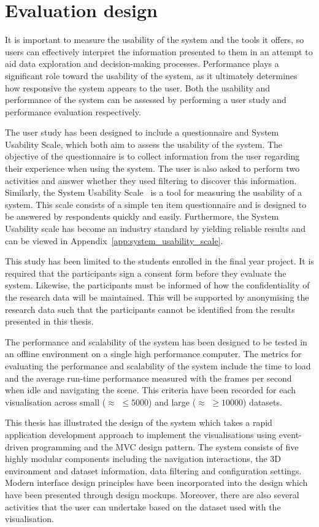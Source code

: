 \section{Evaluation design} {
\label{sec:evaluation_design}

	It is important to measure the usability of the system and the tools it offers, so users can effectively interpret the information presented to them in an attempt to aid data exploration and decision-making processes. Performance plays a significant role toward the usability of the system, as it ultimately determines how responsive the system appears to the user. Both the usability and performance of the system can be assessed by performing a user study and performance evaluation respectively.

	The user study has been designed to include a questionnaire and System Usability Scale, which both aim to assess the usability of the system. The objective of the questionnaire is to collect information from the user regarding their experience when using the system. The user is also asked to perform two activities and answer whether they used filtering to discover this information. Similarly, the System Usability Scale~\parencite{brooke1996sus} is a tool for measuring the usability of a system. This scale consists of a simple ten item questionnaire and is designed to be answered by respondents quickly and easily. Furthermore, the System Usability scale has become an industry standard by yielding reliable results and can be viewed in Appendix~\ref{app:system_usability_scale}.

	This study has been limited to the students enrolled in the final year project. It is required that the participants sign a consent form before they evaluate the system. Likewise, the participants must be informed of how the confidentiality of the research data will be maintained. This will be supported by anonymising the research data such that the participants cannot be identified from the results presented in this thesis.

	The performance and scalability of the system has been designed to be tested in an offline environment on a single high performance computer. The metrics for evaluating the performance and scalability of the system include the time to load and the average run-time performance measured with the frames per second when idle and navigating the scene. This criteria have been recorded for each visualisation across small ($\approx$ $\leqslant5000$) and large ($\approx$ $\geqslant10000$) datasets.


}

This thesis has illustrated the design of the system which takes a rapid application development approach to implement the visualisations using event-driven programming and the MVC design pattern. The system consists of five highly modular components including the navigation interactions, the 3D environment and dataset information, data filtering and configuration settings. Modern interface design principles have been incorporated into the design which have been presented through design mockups. Moreover, there are also several activities that the user can undertake based on the dataset used with the visualisation.
